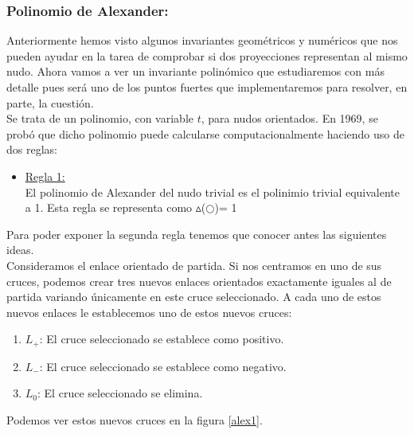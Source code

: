 \documentclass[14pt]{extarticle}
\begin{document}
\bigskip
\begin{center}
	\item \subsubsection{Polinomio de Alexander:}\label{alenudos}
\end{center}
Anteriormente hemos visto algunos invariantes geométricos y numéricos que nos pueden ayudar en la tarea de comprobar si dos proyecciones representan al mismo nudo. Ahora vamos a ver un invariante polinómico que estudiaremos con más detalle pues será uno de los puntos fuertes que implementaremos para resolver, en parte, la cuestión. \\

Se trata de un polinomio, con variable $t$, para nudos orientados. En 1969, se probó que dicho polinomio puede calcularse computacionalmente haciendo uso de dos reglas:
\begin{itemize}
	\item \underline{Regla 1:} \\
	El polinomio de Alexander del nudo trivial es el polinimio trivial equivalente a 1. Esta regla se representa como $\vartriangle$($\bigcirc$)= 1
\end{itemize}

Para poder exponer la segunda regla tenemos que conocer antes las siguientes ideas. \\
Consideramos el enlace orientado de partida. Si nos centramos en uno de sus cruces, podemos crear tres nuevos enlaces orientados exactamente iguales al de partida variando únicamente en este cruce seleccionado. A cada uno de estos nuevos enlaces le establecemos uno de estos nuevos cruces:
\begin{enumerate}
	\item $L_{+}$: El cruce seleccionado se establece como positivo.
	\item $L_{-}$: El cruce seleccionado se establece como negativo.
	\item $L_{0}$: El cruce seleccionado se elimina.
\end{enumerate}
Podemos ver estos nuevos cruces en la figura \ref{alex1}.\\
\end{document}
